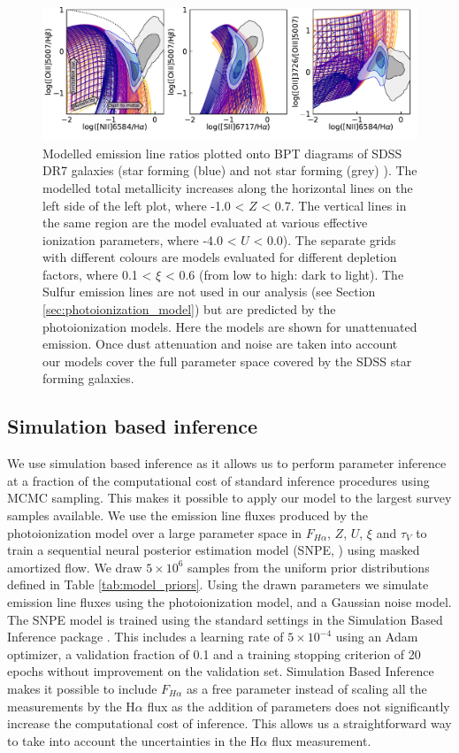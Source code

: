 \documentclass[fleqn,usenatbib]{mnras}
\begin{document}
\begin{figure}
    \centering
    \includegraphics[width=\textwidth]{figures/fig1.pdf}
    \caption{Modelled emission line ratios plotted onto BPT diagrams of SDSS DR7 galaxies (star forming (blue) and not star forming (grey) \citep{kauffmann2003}). The modelled total metallicity increases along the horizontal lines on the left side of the left plot, where -1.0 < $Z$ < 0.7. The vertical lines in the same region are the model evaluated at various effective ionization parameters, where -4.0 < $U$ < 0.0). The separate grids with different colours are models evaluated for different depletion factors, where 0.1 < $\xi$ < 0.6 (from low to high: dark to light). The Sulfur emission lines are not used in our analysis (see Section \ref{sec:photoionization_model}) but are predicted by the photoionization models. Here the models are shown for unattenuated emission. Once dust attenuation and noise are taken into account our models cover the full parameter space covered by the SDSS star forming galaxies.}
    \label{fig:photoionization_model_BPT}
\end{figure}

\subsection{Simulation based inference}
We use simulation based inference as it allows us to perform parameter inference at a fraction of the computational cost of standard inference procedures using MCMC sampling. This makes it possible to apply our model to the largest survey samples available. We use the emission line fluxes produced by the photoionization model over a large parameter space in $F_{H\alpha}$, $Z$, $U$, $\xi$ and $\tau_V$ to train a sequential neural posterior estimation model (SNPE, \cite{greenberg2019}) using masked amortized flow.  We draw $5\times10^6$ samples from the uniform prior distributions defined in Table \ref{tab:model_priors}. Using the drawn parameters we simulate emission line fluxes using the photoionization model, and a Gaussian noise model. The SNPE model is trained using the standard settings in the Simulation Based Inference package \citep{tejero-cantero2020}. This includes a learning rate of $5 \times 10^{-4}$ using an Adam optimizer, a validation fraction of 0.1 and a training stopping criterion of 20 epochs without improvement on the validation set. Simulation Based Inference makes it possible to include $F_{H\alpha}$ as a free parameter instead of scaling all the measurements by the H$\alpha$ flux as the addition of parameters does not significantly increase the computational cost of inference. This allows us a straightforward way to take into account the uncertainties in the H$\alpha$ flux measurement. 
\end{document}
